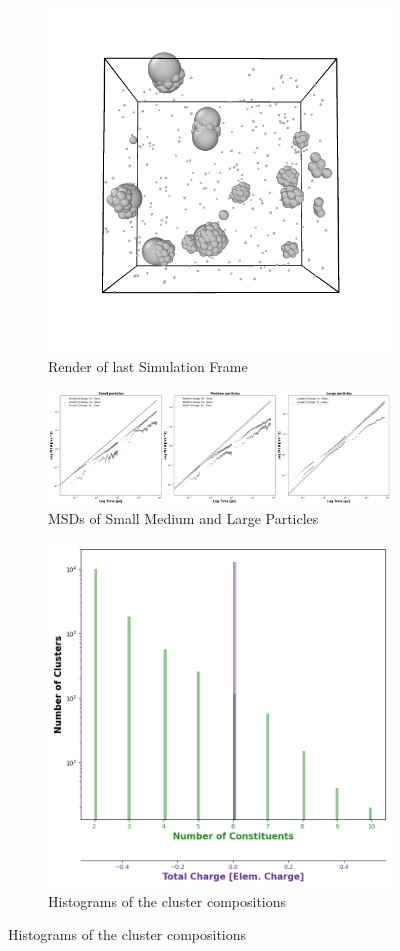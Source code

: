 \documentclass[draft, english]{volcanica-template}
\begin{document}
\begin{figure}[!htbp]
\centering
\begin{figure}[!htbp]
\centering
\includegraphics[width=0.7\linewidth]{files/LastRender-638710b202e2a9f0de90f381a107679c.png}
\caption[]{Render of last Simulation Frame}
\label{Fig7}
\end{figure}

\begin{figure}[!htbp]
\centering
\includegraphics[width=0.7\linewidth]{files/Combined_MSD-36bf99db09a32befc410814bc5eb3007.png}
\caption[]{MSDs of Small Medium and Large Particles}
\label{Fig7_NoQTestSys-b}
\end{figure}

\begin{figure}[!htbp]
\centering
\includegraphics[width=0.7\linewidth]{files/Cluster_Histogram_Fi-7a86040d5f714d5b35f145066d53a59d.png}
\caption[]{Histograms of the cluster compositions}
\label{Fig7_NoQTestSys-c}
\end{figure}


\end{figure}
\end{document}
